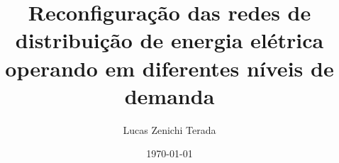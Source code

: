 \documentclass[ABNT, FAPESP]{zentera}
\author{Lucas Zenichi Terada}
\title{Reconfiguração das redes de distribuição de energia elétrica operando em diferentes níveis de demanda}
\date{\today}
\numberwithin{equation}{section}
\begin{document}
\makecover















\end{document}
